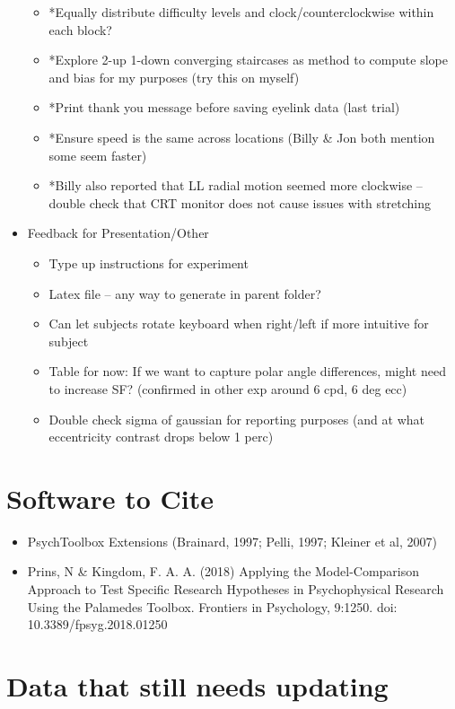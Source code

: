 \documentclass[11pt]{article} %
\begin{document}
\begin{itemize}
\begin{itemize}
	\item *Equally distribute difficulty levels and clock/counterclockwise within each block?
	\item *Explore 2-up 1-down converging staircases as method to compute slope and bias for my purposes (try this on myself)
	\item *Print thank you message before saving eyelink data (last trial)
	\item *Ensure speed is the same across locations (Billy \& Jon both mention some seem faster)
	\item *Billy also reported that LL radial motion seemed more clockwise -- double check that CRT monitor does not cause issues with stretching
	\end{itemize}
\item Feedback for Presentation/Other
	\begin{itemize}
	\item Type up instructions for experiment
	\item Latex file -- any way to generate in parent folder?
	\item Can let subjects rotate keyboard when right/left if more intuitive for subject
	\item Table for now: If we want to capture polar angle differences, might need to increase SF? (confirmed in other exp around 6 cpd, 6 deg ecc)
	\item Double check sigma of gaussian for reporting purposes (and at what eccentricity contrast drops below 1 perc)
	\end{itemize}
\end{itemize}

\section{Software to Cite}
\begin{itemize}
\item PsychToolbox Extensions (Brainard, 1997; Pelli, 1997; Kleiner et al, 2007)
\item Prins, N \& Kingdom, F. A. A. (2018) Applying the Model-Comparison Approach to Test Specific Research Hypotheses in Psychophysical Research Using the Palamedes Toolbox. Frontiers in Psychology, 9:1250. doi: 10.3389/fpsyg.2018.01250
\end{itemize}

\newpage
\section{Data that still needs updating}
\end{document}

